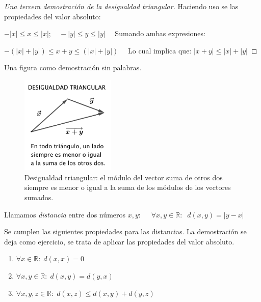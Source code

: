 		\begin{proof}[Una tercera demostración de la desigualdad triangular] Haciendo uso se las propiedades del valor absoluto:
		
		$-|x|\le x\le |x|;\quad -|y|\le y\le |y|\quad $ Sumando ambas expresiones:
		
		$-\left( |x|+|y| \right) \le x+y \le \left( |x|+|y| \right)\quad $	Lo cual implica que: $|x+y|\le |x|+|y|$
			
		\end{proof}
		
		 Una figura como demostración sin palabras.
		
		
		\begin{figure}[H]
			\centering
			\includegraphics[width=0.4\textwidth]{imagenes/imagenes01/T01IM02.png}
			\caption {Desigualdad triangular: el módulo del vector suma de otros dos siempre es menor o igual a la suma de los módulos de los vectores sumados.}
		\end{figure}
		
		 \begin{defi} Llamamos \emph{distancia} entre dos números $x,y:\quad$ $\forall x,y \in \mathbb R:\; \; d(x,y)=|y-x|$
		\end{defi}
		
		 Se cumplen las siguientes propiedades para las distancias. La demostración se deja como ejercicio, se trata de aplicar las propiedades del valor absoluto.
		
		\begin{enumerate}[PD.1]
			\item  $\forall x \in \mathbb R:\; d(x,x)=0 $
			\item  $\forall x, y \in \mathbb R:\; d(x,y)=d(y,x)$
			\item  $\forall x, y, z \in \mathbb R:\; d(x,z) \le d(x,y)+d(y,z)$
		\end{enumerate}
		
		


